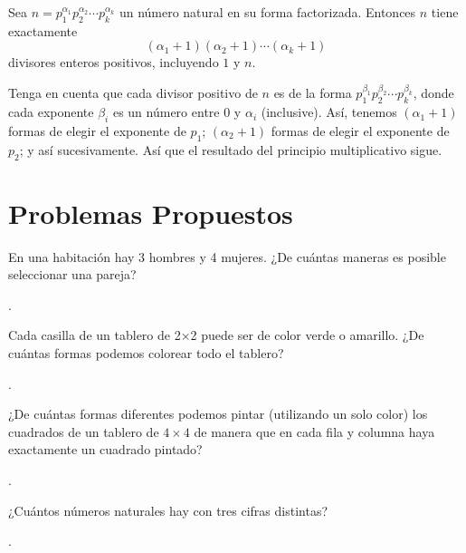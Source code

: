 \documentclass[11pt]{scrartcl}
\begin{document}
\begin{example}
Sea \( n = p_1^{\alpha_1}p_2^{\alpha_2}\cdots p_k^{\alpha_k} \) un número natural en su forma factorizada. Entonces \( n \) tiene exactamente \[ (\alpha_1 + 1)(\alpha_2 + 1) \cdots (\alpha_k + 1) \] divisores enteros positivos, incluyendo \(1\) y \(n\).
\end{example}

Tenga en cuenta que cada divisor positivo de \( n \) es de la forma \( p_1^{\beta_1}p_2^{\beta_2}\cdots p_k^{\beta_k} \), donde cada exponente \( \beta_i \) es un número entre 0 y \( \alpha_i \) (inclusive). Así, tenemos \( (\alpha_1 + 1) \) formas de elegir el exponente de \( p_1 \); \( (\alpha_2 + 1) \) formas de elegir el exponente de \( p_2 \); y así sucesivamente. Así que el resultado del principio multiplicativo sigue.


\section{Problemas Propuestos}
\begin{problem}
En una habitación hay 3 hombres y 4 mujeres. ¿De cuántas maneras es posible
seleccionar una pareja?
\begin{hint}
    .
\end{hint}
\end{problem}

\begin{problem}
Cada casilla de un tablero de 2×2 puede ser de color verde o amarillo. ¿De cuántas formas podemos colorear todo el tablero?
\begin{hint}
    .
    \end{hint}
\end{problem}

\begin{problem}[OBM 2004]
¿De cuántas formas diferentes podemos pintar (utilizando un solo color) los cuadrados de un tablero de \(4 \times 4\) de manera que en cada fila y columna haya exactamente un cuadrado pintado?
    \begin{hint}
    .
    \end{hint}
\end{problem}

\begin{problem}
¿Cuántos números naturales hay con tres cifras distintas?
\begin{hint}
.
\end{hint}
\end{problem}
\end{document}

